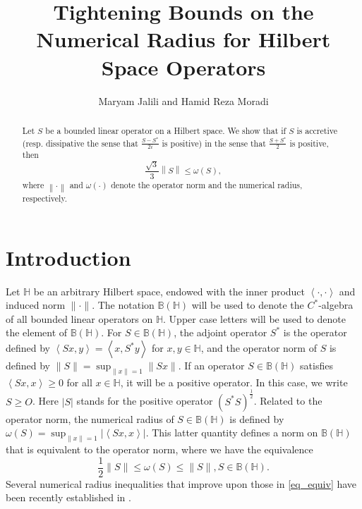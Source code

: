\documentclass[12pt,twoside,reqno]{amsart}
\numberwithin{equation}{section}
\begin{document}
\title{Tightening Bounds on the Numerical Radius for Hilbert Space Operators}
\author{Maryam Jalili and Hamid Reza Moradi}



\begin{abstract}
Let $S$ be a bounded linear operator on a Hilbert space. We show that if $S$ is accretive (resp. dissipative the sense that $\frac{S-{{S}^{*}}}{2i}$ is positive) in the sense that $\frac{S+{{S}^{*}}}{2}$ is positive, then
\[\frac{\sqrt{3}}{3}\left\| S \right\|\le \omega \left( S \right),\]
where $\left\| \cdot \right\| $ and $\omega \left( \cdot \right)$ denote the operator norm and the numerical radius, respectively.
\end{abstract}


\maketitle
\pagestyle{myheadings}
%
\markboth{\centerline{}}
{\centerline{}}
\bigskip
\bigskip

\section{Introduction}
Let $\mathbb{H}$ be an arbitrary Hilbert space, endowed with the inner product $\left<\cdot,\cdot\right>$ and induced norm $\|\cdot\|.$ The notation $\mathbb{B}(\mathbb{H})$ will be used to denote the $C^*$-algebra of all bounded linear operators on $\mathbb{H}$. Upper case letters will be used to denote the element of $\mathbb{B}(\mathbb{H})$. For $S\in\mathbb{B}(\mathbb{H})$, the adjoint operator $S^*$ is the operator defined by $\left<Sx,y\right>=\left<x,S^*y\right>$ for $x,y\in\mathbb{H}$, and the operator norm of $S$ is defined by $\|S\|=\sup_{\|x\|=1}\|Sx\|$. If an operator $S\in\mathbb{B}(\mathbb{H})$ satisfies $\left<Sx,x\right>\geq 0$ for all $x\in\mathbb{H}$, it will be a positive operator.  In this case, we write $S\ge O$. Here $\left| S \right|$ stands for the positive operator ${{\left( {{S}^{*}}S \right)}^{\frac{1}{2}}}$. Related to the operator norm, the numerical radius of $S\in\mathbb{B}(\mathbb{H})$ is defined by $\omega(S)=\sup_{\|x\|=1}|\left<Sx,x\right>|$. This latter quantity defines a norm on $\mathbb{B}(\mathbb{H})$ that is equivalent to the operator norm, where we have the equivalence
\begin{equation}\label{eq_equiv}
\frac{1}{2}\|S\|\leq \omega(S)\leq \|S\|, S\in\mathbb{B}(\mathbb{H}).
\end{equation} 
Several numerical radius inequalities that improve upon those in \eqref{eq_equiv} have been recently established in \cite{HOM, KMS, SM2023, SMS, S, Yamazaki_Studia_2007}.
\end{document}
